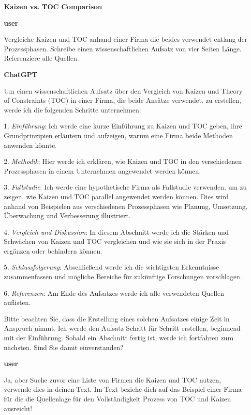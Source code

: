 \textbf{Kaizen vs. TOC Comparison}

\textbf{user}

Vergleiche Kaizen und TOC anhand einer Firma die beides verwendet entlang der Prozessphasen. Schreibe einen wissenschaftlichen Aufsatz von vier Seiten Länge. Referenziere alle Quellen. 

\textbf{ChatGPT}

Um einen wissenschaftlichen Aufsatz über den Vergleich von Kaizen und Theory of Constraints (TOC) in einer Firma, die beide Ansätze verwendet, zu erstellen, werde ich die folgenden Schritte unternehmen:

1. \textit{Einführung}: Ich werde eine kurze Einführung zu Kaizen und TOC geben, ihre Grundprinzipien erläutern und aufzeigen, warum eine Firma beide Methoden anwenden könnte.

2. \textit{Methodik}: Hier werde ich erklären, wie Kaizen und TOC in den verschiedenen Prozessphasen in einem Unternehmen angewendet werden können.

3. \textit{Fallstudie}: Ich werde eine hypothetische Firma als Fallstudie verwenden, um zu zeigen, wie Kaizen und TOC parallel angewendet werden können. Dies wird anhand von Beispielen aus verschiedenen Prozessphasen wie Planung, Umsetzung, Überwachung und Verbesserung illustriert.

4. \textit{Vergleich und Diskussion}: In diesem Abschnitt werde ich die Stärken und Schwächen von Kaizen und TOC vergleichen und wie sie sich in der Praxis ergänzen oder behindern können.

5. \textit{Schlussfolgerung}: Abschließend werde ich die wichtigsten Erkenntnisse zusammenfassen und mögliche Bereiche für zukünftige Forschungen vorschlagen.

6. \textit{Referenzen}: Am Ende des Aufsatzes werde ich alle verwendeten Quellen auflisten.

Bitte beachten Sie, dass die Erstellung eines solchen Aufsatzes einige Zeit in Anspruch nimmt. Ich werde den Aufsatz Schritt für Schritt erstellen, beginnend mit der Einführung. Sobald ein Abschnitt fertig ist, werde ich fortfahren zum nächsten. Sind Sie damit einverstanden?

\textbf{user}

Ja, aber Suche zuvor eine Liste von Firmen die Kaizen und TOC nutzen, verwende dies in deinen Text. Im Text beziehe dich auf das Beispiel einer Firma für die die Quellenlage für den Vollständigkeit Prozess von TOC und Kaizen ausreicht!

